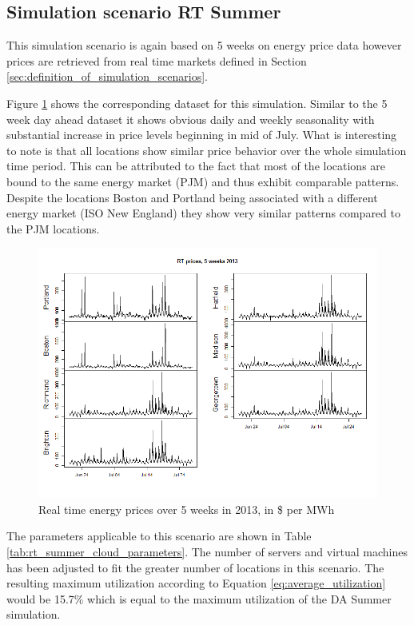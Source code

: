 \subsection{Simulation scenario RT Summer} \label{ssec:simulation_scenario_rt_summer}

This simulation scenario is again based on 5 weeks on energy price data however prices are retrieved from real time markets defined in Section \ref{sec:definition_of_simulation_scenarios}. 


Figure \ref{fig:rt_sim_2013_5weeks} shows the corresponding dataset for this simulation. Similar to the 5 week day ahead dataset it shows obvious daily and weekly seasonality with substantial increase in price levels beginning in mid of July. What is interesting to note is that all locations show similar price behavior over the whole simulation time period. This can be attributed to the fact that most of the locations are bound to the same energy market (PJM) and thus exhibit comparable patterns. Despite the locations Boston and Portland being associated with a different energy market (ISO New England) they show very similar patterns compared to the PJM locations. 

\begin{figure}[htbp]
	\centering
		\includegraphics[width=1.00\textwidth]{figures/evaluation_and_results/rt_sim_2013_5weeks.png}
	\caption{Real time energy prices over 5 weeks in 2013, in \$ per MWh}
	\label{fig:rt_sim_2013_5weeks}
\end{figure}

The parameters applicable to this scenario are shown in Table \ref{tab:rt_summer_cloud_parameters}. The number of servers and virtual machines has been adjusted to fit the greater number of locations in this scenario. The resulting maximum utilization according to Equation \ref{eq:average_utilization} would be 15.7\% which is equal to the maximum utilization of the DA Summer simulation. 

